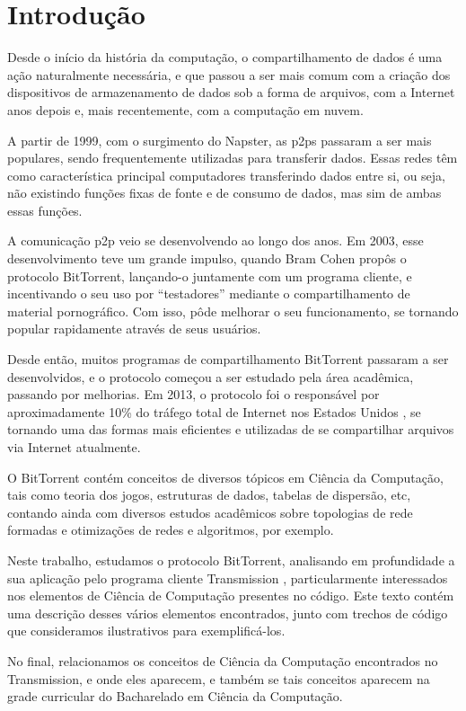 
\chapter{Introdução}

Desde o início da história da computação, o compartilhamento de dados é uma ação
naturalmente necessária, e que passou a ser mais comum com a criação dos dispositivos de
armazenamento de dados sob a forma de arquivos, com a Internet anos depois e, mais
recentemente, com a computação em nuvem.

A partir de 1999, com o surgimento do Napster, as \glspl{p2p} passaram a ser mais
populares, sendo frequentemente utilizadas para transferir dados. Essas redes têm como
característica principal computadores transferindo dados entre si, ou seja, não
existindo funções fixas de fonte e de consumo de dados, mas sim de ambas essas funções.

A comunicação \gls*{p2p} veio se desenvolvendo ao longo dos anos. Em 2003, esse
desenvolvimento teve um grande impulso, quando Bram Cohen propôs o protocolo BitTorrent,
lançando-o juntamente com um programa cliente, e incentivando o seu uso por
``testadores'' mediante o compartilhamento de material pornográfico. Com isso, pôde
melhorar o seu funcionamento, se tornando popular rapidamente através de seus usuários.

Desde então, muitos programas de compartilhamento BitTorrent passaram a ser
desenvolvidos, e o protocolo começou a ser estudado pela área acadêmica, passando por
melhorias. Em 2013, o protocolo foi o responsável por aproximadamente 10\% do tráfego
total de Internet nos Estados Unidos \cite{report:internet-usage-2013}, se tornando uma
das formas mais eficientes e utilizadas de se compartilhar arquivos via Internet
atualmente.

O BitTorrent contém conceitos de diversos tópicos em Ciência da Computação, tais como
teoria dos jogos, estruturas de dados, tabelas de dispersão, etc, contando ainda com
diversos estudos acadêmicos sobre topologias de rede formadas e otimizações de redes e
algoritmos, por exemplo.

Neste trabalho, estudamos o protocolo BitTorrent, analisando em profundidade a sua
aplicação pelo programa cliente Transmission \cite{site:transmission}, particularmente
interessados nos elementos de Ciência de Computação presentes no código. Este texto
contém uma descrição desses vários elementos encontrados, junto com trechos de código
que consideramos ilustrativos para exemplificá-los.

No final, relacionamos os conceitos de Ciência da Computação encontrados no
Transmission, e onde eles aparecem, e também se tais conceitos aparecem na grade
curricular do Bacharelado em Ciência da Computação.

\afterpage{\clearpage}